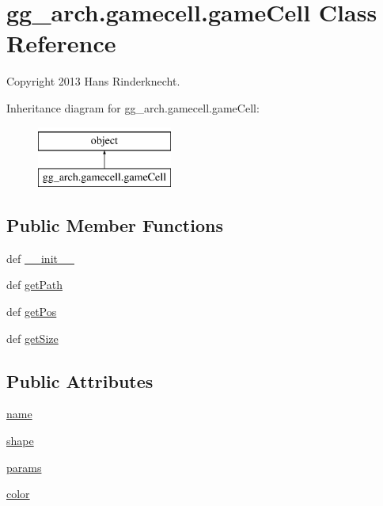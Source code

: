 \hypertarget{classgg__arch_1_1gamecell_1_1game_cell}{\section{gg\-\_\-arch.\-gamecell.\-game\-Cell Class Reference}
\label{classgg__arch_1_1gamecell_1_1game_cell}
}


Copyright 2013 Hans Rinderknecht.  


Inheritance diagram for gg\-\_\-arch.\-gamecell.\-game\-Cell\-:\begin{figure}[H]
\begin{center}
\leavevmode
\includegraphics[height=2.000000cm]{classgg__arch_1_1gamecell_1_1game_cell}
\end{center}
\end{figure}
\subsection*{Public Member Functions}
\begin{DoxyCompactItemize}
\item 
def \hyperlink{classgg__arch_1_1gamecell_1_1game_cell_ab8530cca4fbeecff3c0c640a9a54d1a5}{\-\_\-\-\_\-init\-\_\-\-\_\-}
\item 
def \hyperlink{classgg__arch_1_1gamecell_1_1game_cell_a9e3e51533b4e4c218d0797594eca21bc}{get\-Path}
\item 
def \hyperlink{classgg__arch_1_1gamecell_1_1game_cell_a871fbb9dac6b5417d36bcf5d67ff7450}{get\-Pos}
\item 
def \hyperlink{classgg__arch_1_1gamecell_1_1game_cell_af252d35279981de75c47dd5ba9c71a63}{get\-Size}
\end{DoxyCompactItemize}
\subsection*{Public Attributes}
\begin{DoxyCompactItemize}
\item 
\hyperlink{classgg__arch_1_1gamecell_1_1game_cell_ada75b7dbbea4a61dc10b6227a43d0f78}{name}
\item 
\hyperlink{classgg__arch_1_1gamecell_1_1game_cell_a68355a86a7580f16ade2446991f2a4b3}{shape}
\item 
\hyperlink{classgg__arch_1_1gamecell_1_1game_cell_aae0a2c4e1e821fee5c4d6d298840e403}{params}
\item 
\hyperlink{classgg__arch_1_1gamecell_1_1game_cell_ae87be21f16d1f9d0225e4826ccd46e1b}{color}
\end{DoxyCompactItemize}


